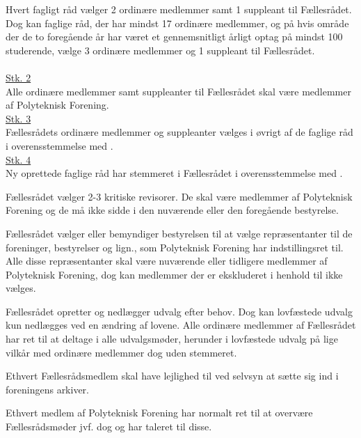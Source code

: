\begin{list}
\item \label{L:FR:ValgtilFR} Hvert fagligt råd vælger 2 ordinære medlemmer samt 1 suppleant til Fællesrådet. Dog kan faglige råd, der har mindst 17 ordinære medlemmer, og på hvis område der de to foregående år har været et gennemsnitligt årligt optag på mindst 100 studerende, vælge 3 ordinære medlemmer og 1 suppleant til Fællesrådet.\\
\\
\underline{Stk. 2}\\
Alle ordinære medlemmer samt suppleanter til Fællesrådet skal være medlemmer af Polyteknisk Forening.\\

\underline{Stk. 3}\\
Fællesrådets ordinære medlemmer og suppleanter vælges i øvrigt af de faglige råd i overensstemmelse med .\\

\underline{Stk. 4}\\
Ny oprettede faglige råd har stemmeret i Fællesrådet i overensstemmelse med .

\item Fællesrådet vælger 2-3 kritiske revisorer. De skal være medlemmer af Polyteknisk Forening og de må ikke sidde i den nuværende eller den foregående bestyrelse. 

\item Fællesrådet vælger eller bemyndiger bestyrelsen til at vælge repræsentanter til de foreninger, bestyrelser og lign., som Polyteknisk Forening har indstillingsret til. Alle disse repræsentanter skal være nuværende eller tidligere medlemmer af Polyteknisk Forening, dog kan medlemmer der er ekskluderet i henhold til  ikke vælges.

\item Fællesrådet opretter og nedlægger udvalg efter behov. Dog kan lovfæstede udvalg kun nedlægges ved en ændring af lovene. Alle ordinære medlemmer af Fællesrådet har ret til at deltage i alle udvalgsmøder, herunder i lovfæstede udvalg på lige vilkår med ordinære medlemmer dog uden stemmeret.

\item Ethvert Fællesrådsmedlem skal have lejlighed til ved selvsyn at sætte sig ind i foreningens arkiver.

\item Ethvert medlem af Polyteknisk Forening har normalt ret til at overvære Fællesrådsmøder jvf. dog  og har taleret til disse.


\end{list}
